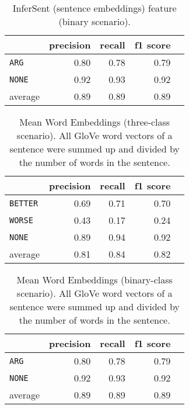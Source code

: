 \begin{table}[h] 
	\centering 
	\caption{InferSent (sentence embeddings) feature (binary scenario).} 
	\begin{tabular}{@{}lrrrr@{}}
		\toprule
		                & precision & recall & f1 score \\ \midrule 
		\texttt{ARG}    & 0.80      & 0.78   & 0.79     \\ 
		\texttt{NONE}   & 0.92      & 0.93   & 0.92     \\ 
		average         & 0.89      & 0.89   & 0.89     \\ 			\bottomrule
	\end{tabular}
\end{table}


\begin{table}[htbp] 
	\centering 
	\caption{Mean Word Embeddings (three-class scenario). All GloVe word vectors of a sentence were summed up and divided by the number of words in the sentence.} 
	\begin{tabular}{@{}lrrrr@{}}
		\toprule
		                & precision & recall & f1 score \\ \midrule 
		\texttt{BETTER} & 0.69      & 0.71   & 0.70     \\ 
		\texttt{WORSE}  & 0.43      & 0.17   & 0.24     \\ 
		\texttt{NONE}   & 0.89      & 0.94   & 0.92     \\ 
		average         & 0.81      & 0.84   & 0.82     \\ 			\bottomrule
	\end{tabular}
\end{table}

\begin{table}[h] 
	\centering 
	\caption{Mean Word Embeddings (binary-class scenario). All GloVe word vectors of a sentence were summed up and divided by the number of words in the sentence.}
	\begin{tabular}{@{}lrrrr@{}}
		\toprule
		                & precision & recall & f1 score \\ \midrule 
		\texttt{ARG}    & 0.80      & 0.78   & 0.79     \\ 
		\texttt{NONE}   & 0.92      & 0.93   & 0.92     \\ 
		average         & 0.89      & 0.89   & 0.89     \\ 			\bottomrule
	\end{tabular}
\end{table}



